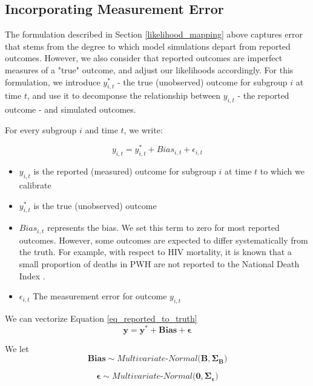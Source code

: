 \documentclass{article}
\begin{document}
\subsection{Incorporating Measurement Error}\label{measurement_error}

The formulation described in Section \ref{likelihood_mapping} above captures error that stems from the degree to which model simulations depart from reported outcomes. However, we also consider that reported outcomes are imperfect measures of a "true" outcome, and adjust our likelihoods accordingly.
For this formulation, we introduce $y^*_{i,t}$ - the true (unobserved) outcome for subgroup $i$ at time $t$, and use it to decomponse the relationship between $y_{i,t}$ - the reported outcome - and simulated outcomes.

For every subgroup $i$ and time $t$, we write:

\begin{equation}
	y_{i,t} = y^*_{i,t} + Bias_{i,t} + \epsilon_{i,t} \label{eq_reported_to_truth}
\end{equation}

\begin{itemize}
	\item $y_{i,t}$ is the reported (measured) outcome for subgroup $i$ at time $t$ to which we calibrate
	\item $y^*_{i,t}$ is the true (unobserved) outcome 
	\item $Bias_{i,t}$ represents the bias.	We set this term to zero for most reported outcomes. However, some outcomes are expected to differ systematically from the truth. For example, with respect to HIV mortality, it is known that a small proportion of deaths in PWH are not reported to the National Death Index \cite{hanna2009,trepka2011}.
	\item $\epsilon_{i,t}$ The measurement error for outcome $y_{i,t}$
\end{itemize}

We can vectorize Equation \ref{eq_reported_to_truth}
\begin{equation}
	\bm{y} = \bm{y^*} + \bm{Bias} + \bm{\epsilon}
\end{equation}

We let
\begin{equation}
	\bm{Bias} \sim Multivariate\textit{-}Normal\Big(\bm{B}, \bm{\Sigma_B}\Big) \label{eq_bias}
\end{equation}

\begin{equation}
	\bm{\epsilon} \sim Multivariate\textit{-}Normal\Big(\bm{0}, \bm{\Sigma_\epsilon}\Big) \label{eq_epsilon}
\end{equation}
\end{document}
